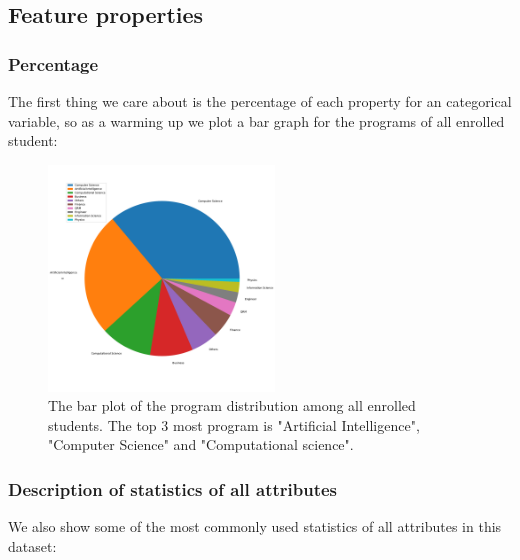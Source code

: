 \documentclass[runningheads]{llncs}
\begin{document}
\subsection{Feature properties}
\subsubsection{Percentage}
The first thing we care about is the percentage of each property for an categorical variable, so as a warming up we plot a bar graph for the programs of all enrolled student:

\begin{figure}[h]
    \centering
    \includegraphics[width=6cm]{./images/pie_plot.pdf}
    \caption{The bar plot of the program distribution among all enrolled students. The top 3 most program is "Artificial Intelligence", "Computer Science" and "Computational science".}
    \label{fig:bar}
\end{figure}
\subsubsection{Description of statistics of all attributes}
We also show some of the most commonly used statistics of all attributes in this dataset:
\end{document}
